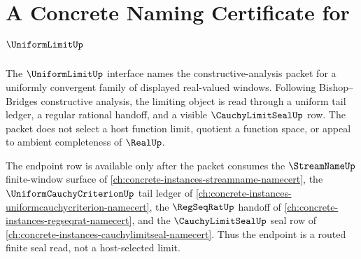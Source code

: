 \chapter{A Concrete Naming Certificate for $\UniformLimitUp$}
\label{ch:concrete-instances-uniformlimit-namecert}

The $\UniformLimitUp$ interface names the constructive-analysis packet for a uniformly convergent family of displayed real-valued windows. Following Bishop--Bridges constructive analysis, the limiting object is read through a uniform tail ledger, a regular rational handoff, and a visible $\CauchyLimitSealUp$ row. The packet does not select a host function limit, quotient a function space, or appeal to ambient completeness of $\RealUp$.

The endpoint row is available only after the packet consumes the $\StreamNameUp$ finite-window surface of \autoref{ch:concrete-instances-streamname-namecert}, the $\UniformCauchyCriterionUp$ tail ledger of \autoref{ch:concrete-instances-uniformcauchycriterion-namecert}, the $\RegSeqRatUp$ handoff of \autoref{ch:concrete-instances-regseqrat-namecert}, and the $\CauchyLimitSealUp$ seal row of \autoref{ch:concrete-instances-cauchylimitseal-namecert}. Thus the endpoint is a routed finite seal read, not a host-selected limit.

